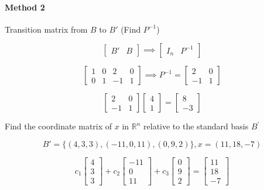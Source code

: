 \documentclass{report}
\begin{document}
\paragraph{Method 2} Transition matrix from $B$ to $B'$ (Find $P^{-1}$)

$$
\begin{bmatrix} B' & B \end{bmatrix} \implies \begin{bmatrix} I_n & P^{-1} \end{bmatrix}
$$

$$
\begin{bmatrix} 1 & 0 & 2 & 0 \\ 0 & 1 & -1 & 1 \end{bmatrix} \implies  P^{-1} = \begin{bmatrix} 2 & 0 \\ -1 & 1 \end{bmatrix}
$$

$$
\begin{bmatrix} 2 & 0 \\ -1 & 1 \end{bmatrix} \begin{bmatrix} 4 \\ 1 \end{bmatrix} = \begin{bmatrix} 8 \\ -3 \end{bmatrix}
$$

\begin{tcolorbox}[colframe = lightred]
	Find the coordinate matrix of $x$ in $\mathbb{R}^n$ relative to the standard basis $B^{'}$
	
	$$
	B' = \{ (4,3,3), (-11,0,11),(0,9,2)\}, x = (11,18,-7)
	$$
\end{tcolorbox}

$$
c_1 \begin{bmatrix} 4 \\ 3 \\ 3 \end{bmatrix} + c_2 \begin{bmatrix} -11 \\ 0 \\ 11 \end{bmatrix} + c_3 \begin{bmatrix} 0 \\ 9 \\ 2 \end{bmatrix} = \begin{bmatrix} 11 \\ 18 \\ -7 \end{bmatrix}
$$
\end{document}
